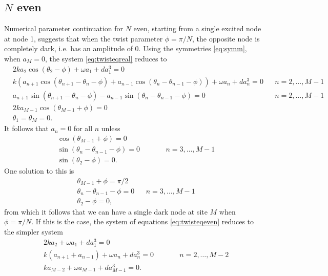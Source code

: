 \documentclass[12pt]{article}
\begin{document}
\subsection{\texorpdfstring{$N$}{N} even}

Numerical parameter continuation for $N$ even, starting from a single excited node at node 1, suggests that when the twist parameter $\phi = \pi/N$, the opposite node is completely dark, i.e. has an amplitude of 0. Using the symmetries \cref{eq:symm}, when $a_M = 0$, the system \cref{eq:twisteqreal} reduces to
\begin{equation}\label{eq:twisteqeven}
\begin{aligned}
&2 k a_2 \cos(\theta_2 - \phi) + \omega a_1 + d a_1^3 = 0 \\
&k( a_{n+1} \cos(\theta_{n+1}-\theta_n-\phi) + a_{n-1} \cos(\theta_n - \theta_{n-1}-\phi)) + \omega a_n + d a_n^3 = 0 && n = 2, \dots, M-1 \\
&a_{n+1} \sin(\theta_{n+1}-\theta_n-\phi) - a_{n-1} \sin(\theta_n - \theta_{n-1}-\phi) = 0 && n = 2, \dots, M-1 \\
&2 k a_{M-1} \cos(\theta_{M-1} + \phi) = 0 \\
& \theta_1 = \theta_M = 0.
\end{aligned}
\end{equation}
It follows that $a_n = 0$ for all $n$ unless
\begin{equation}\label{eq:evendarknodecond}
\begin{aligned}
&\cos(\theta_{M-1} + \phi) = 0 \\
&\sin(\theta_{n} - \theta_{n-1} - \phi) = 0 && \qquad n = 3, \dots, M-1 \\
&\sin(\theta_2 - \phi) = 0.
\end{aligned}
\end{equation}
One solution to this is
\begin{equation}\label{eq:evendarknodecond1}
\begin{aligned}
&\theta_{M-1} + \phi = \pi/2 \\
&\theta_{n} - \theta_{n-1} - \phi = 0 && n = 3, \dots, M-1 \\
&\theta_2 - \phi = 0,
\end{aligned}
\end{equation}
from which it follows that we can have a single dark node at site $M$ when $\phi = \pi/N$. If this is the case, the system of equations \cref{eq:twisteqeven} reduces to the simpler system 
\begin{equation}\label{eq:twisteqevenhole}
\begin{aligned}
&2 k a_2 + \omega a_1 + d a_1^3 = 0 \\
&k\left( a_{n+1} + a_{n-1} \right) + \omega a_n + d a_n^3 = 0 && \qquad n = 2, \dots, M-2 \\
&k a_{M-2} + \omega a_{M-1} + d a_{M-1}^3 = 0.
\end{aligned}
\end{equation}
\end{document}
